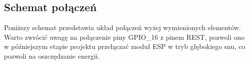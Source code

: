 \subsection{Schemat połączeń}

Poniższy schemat przedstawia układ połączeń wyżej wymienionych elementów. Warto zwrócić uwagę na połączenie piny GPIO\_16 z pinem REST, pozwoli ono w późniejszym etapie projektu przełączać moduł ESP w tryb głębokiego snu, co pozwoli na oszczędzanie energii.

\begin{center}
\end{center}

